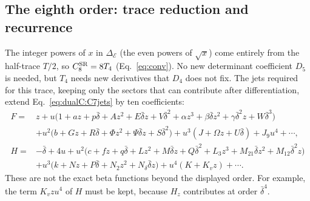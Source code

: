 \documentclass[11pt,a4paper]{article}
\numberwithin{equation}{section}
\newcommand{\De}{\Delta_{\mathcal E}}
\newcommand{\CSR}{C^{\rm SR}}
\newcommand{\db}{\bar\delta}
\begin{document}
\subsection{The eighth order: trace reduction and recurrence}\label{app:dualC:C8setup}
The integer powers of $x$ in $\De$ (the even powers of $\sqrt x$) come entirely from the half-trace $T/2$, so
$\CSR_8=8T_4$ (Eq.~\eqref{eq:conv}). No
new determinant coefficient $D_5$ is needed, but $T_4$ needs new derivatives that $D_4$ does not fix. The jets
required for this trace, keeping only the sectors that can contribute after differentiation, extend
Eq.~\eqref{eq:dualC:C7jets} by ten coefficients:
\begin{equation}
\begin{aligned}
 F={}&z+u\bigl(1+az+p\db+Az^2+E\db z+V\db^2+\alpha z^3+\beta\db z^2+\gamma\db^2z+W\db^3\bigr)\\
 &+u^2\bigl(b+Gz+R\db+\Phi z^2+\Psi\db z+S\db^2\bigr)+u^3(J+\Omega z+U\db)+J_9u^4+\cdots,\\
 H={}&-\db+4u+u^2\bigl(c+fz+q\db+Lz^2+M\db z+Q\db^2+L_3z^3+M_{21}\db z^2+M_{12}\db^2z\bigr)\\
 &+u^3\bigl(k+Nz+P\db+N_2z^2+N_\delta\db z\bigr)+u^4(K+K_vz)+\cdots.
\end{aligned}
\label{eq:dualC:C8jets}
\end{equation}
These are not the exact beta functions beyond the displayed order. For example, the term $K_vzu^4$ of $H$ must be kept,
because $H_z$ contributes at order $\db^4$.
\end{document}
